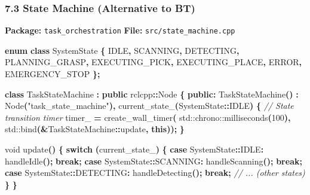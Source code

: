 \documentclass[
]{article}
\newenvironment{Shaded}{\begin{snugshade}}{\end{snugshade}}
\newcommand{\BuiltInTok}[1]{#1}
\newcommand{\CommentTok}[1]{\textcolor[rgb]{0.56,0.35,0.01}{\textit{#1}}}
\newcommand{\ControlFlowTok}[1]{\textcolor[rgb]{0.13,0.29,0.53}{\textbf{#1}}}
\newcommand{\DataTypeTok}[1]{\textcolor[rgb]{0.13,0.29,0.53}{#1}}
\newcommand{\DecValTok}[1]{\textcolor[rgb]{0.00,0.00,0.81}{#1}}
\newcommand{\KeywordTok}[1]{\textcolor[rgb]{0.13,0.29,0.53}{\textbf{#1}}}
\newcommand{\NormalTok}[1]{#1}
\newcommand{\OperatorTok}[1]{\textcolor[rgb]{0.81,0.36,0.00}{\textbf{#1}}}
\newcommand{\StringTok}[1]{\textcolor[rgb]{0.31,0.60,0.02}{#1}}
\newcommand{\VariableTok}[1]{\textcolor[rgb]{0.00,0.00,0.00}{#1}}
\begin{document}
\hypertarget{state-machine-alternative-to-bt}{%
\subsubsection{7.3 State Machine (Alternative to
BT)}\label{state-machine-alternative-to-bt}}

\textbf{Package:} \texttt{task\_orchestration} \textbf{File:}
\texttt{src/state\_machine.cpp}

\begin{Shaded}
\begin{Highlighting}[]
\KeywordTok{enum} \KeywordTok{class}\NormalTok{ SystemState }\OperatorTok{\{}
\NormalTok{    IDLE}\OperatorTok{,}
\NormalTok{    SCANNING}\OperatorTok{,}
\NormalTok{    DETECTING}\OperatorTok{,}
\NormalTok{    PLANNING\_GRASP}\OperatorTok{,}
\NormalTok{    EXECUTING\_PICK}\OperatorTok{,}
\NormalTok{    EXECUTING\_PLACE}\OperatorTok{,}
\NormalTok{    ERROR}\OperatorTok{,}
\NormalTok{    EMERGENCY\_STOP}
\OperatorTok{\};}

\KeywordTok{class}\NormalTok{ TaskStateMachine }\OperatorTok{:} \KeywordTok{public}\NormalTok{ rclcpp}\OperatorTok{::}\NormalTok{Node }\OperatorTok{\{}
\KeywordTok{public}\OperatorTok{:}
\NormalTok{    TaskStateMachine}\OperatorTok{()} \OperatorTok{:}\NormalTok{ Node}\OperatorTok{(}\StringTok{"task\_state\_machine"}\OperatorTok{),} \VariableTok{current\_state\_}\OperatorTok{(}\NormalTok{SystemState}\OperatorTok{::}\NormalTok{IDLE}\OperatorTok{)} \OperatorTok{\{}
        \CommentTok{// State transition timer}
        \VariableTok{timer\_} \OperatorTok{=}\NormalTok{ create\_wall\_timer}\OperatorTok{(}
            \BuiltInTok{std::}\NormalTok{chrono::milliseconds}\OperatorTok{(}\DecValTok{100}\OperatorTok{),}
            \BuiltInTok{std::}\NormalTok{bind}\OperatorTok{(\&}\NormalTok{TaskStateMachine}\OperatorTok{::}\NormalTok{update}\OperatorTok{,} \KeywordTok{this}\OperatorTok{));}
    \OperatorTok{\}}

    \DataTypeTok{void}\NormalTok{ update}\OperatorTok{()} \OperatorTok{\{}
        \ControlFlowTok{switch} \OperatorTok{(}\VariableTok{current\_state\_}\OperatorTok{)} \OperatorTok{\{}
            \ControlFlowTok{case}\NormalTok{ SystemState}\OperatorTok{::}\NormalTok{IDLE}\OperatorTok{:}
\NormalTok{                handleIdle}\OperatorTok{();}
                \ControlFlowTok{break}\OperatorTok{;}
            \ControlFlowTok{case}\NormalTok{ SystemState}\OperatorTok{::}\NormalTok{SCANNING}\OperatorTok{:}
\NormalTok{                handleScanning}\OperatorTok{();}
                \ControlFlowTok{break}\OperatorTok{;}
            \ControlFlowTok{case}\NormalTok{ SystemState}\OperatorTok{::}\NormalTok{DETECTING}\OperatorTok{:}
\NormalTok{                handleDetecting}\OperatorTok{();}
                \ControlFlowTok{break}\OperatorTok{;}
            \CommentTok{// ... (other states)}
        \OperatorTok{\}}
    \OperatorTok{\}}


\end{Highlighting}
\end{Shaded}
\end{document}
